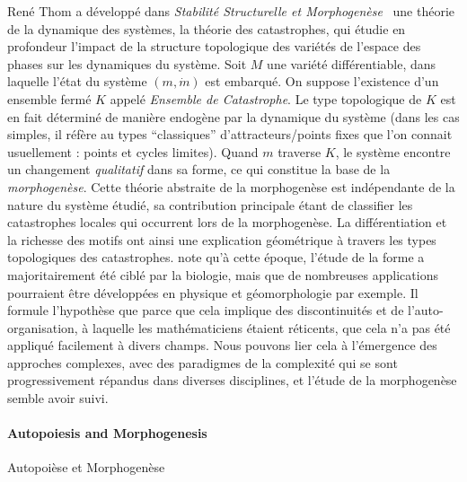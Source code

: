 {Ren{\'e} Thom a développé dans \emph{Stabilité Structurelle et Morphogenèse}~\cite{thom1974stabilite} une théorie de la dynamique des systèmes, la théorie des catastrophes, qui étudie en profondeur l'impact de la structure topologique des variétés de l'espace des phases sur les dynamiques du système. Soit $M$ une variété différentiable, dans laquelle l'état du système $(m,\dot{m})$ est embarqué. On suppose l'existence d'un ensemble fermé $K$ appelé \emph{Ensemble de Catastrophe}. Le type topologique de $K$ est en fait déterminé de manière endogène par la dynamique du système (dans les cas simples, il réfère au types ``classiques'' d'attracteurs/points fixes que l'on connait usuellement : points et cycles limites). Quand $m$ traverse $K$, le système encontre un changement \emph{qualitatif} dans sa forme, ce qui constitue la base de la \emph{morphogenèse}. Cette théorie abstraite de la morphogenèse est indépendante de la nature du système étudié, sa contribution principale étant de classifier les catastrophes locales qui occurrent lors de la morphogenèse. La différentiation et la richesse des motifs ont ainsi une explication géométrique à travers les types topologiques des catastrophes.  note qu'à cette époque, l'étude de la forme a majoritairement été ciblé par la biologie, mais que de nombreuses applications pourraient être développées en physique et géomorphologie par exemple. Il formule l'hypothèse que parce que cela implique des discontinuités et de l'auto-organisation, à laquelle les mathématiciens étaient réticents, que cela n'a pas été appliqué facilement à divers champs. Nous pouvons lier cela à l'émergence des approches complexes, avec des paradigmes de la complexité qui se sont progressivement répandus dans diverses disciplines, et l'étude de la morphogenèse semble avoir suivi. 
}



\paragraph{Autopoiesis and Morphogenesis}{Autopoièse et Morphogenèse}


